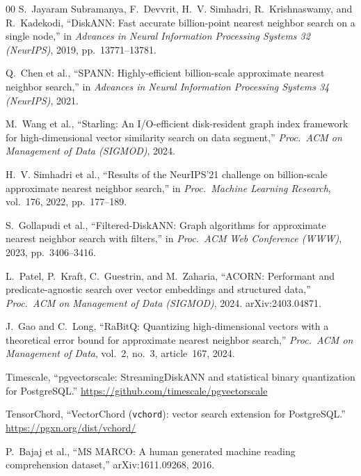 \documentclass[preprint,12pt]{elsarticle}
\begin{document}
\begin{thebibliography}{00}
S.~Jayaram Subramanya, F.~Devvrit, H.~V. Simhadri, R.~Krishnaswamy, and R.~Kadekodi,
``DiskANN: Fast accurate billion-point nearest neighbor search on a single node,'' in
\textit{Advances in Neural Information Processing Systems 32 (NeurIPS)}, 2019,
pp.~13771--13781.

Q.~Chen et al., ``SPANN: Highly-efficient billion-scale approximate nearest neighbor
search,'' in \textit{Advances in Neural Information Processing Systems 34 (NeurIPS)}, 2021.

M.~Wang et al., ``Starling: An I/O-efficient disk-resident graph index framework for
high-dimensional vector similarity search on data segment,'' \textit{Proc.\ ACM on Management
of Data (SIGMOD)}, 2024.

H.~V. Simhadri et al., ``Results of the NeurIPS'21 challenge on billion-scale approximate
nearest neighbor search,'' in \textit{Proc.\ Machine Learning Research}, vol.~176, 2022,
pp.~177--189.

S.~Gollapudi et al., ``Filtered-DiskANN: Graph algorithms for approximate nearest neighbor
search with filters,'' in \textit{Proc.\ ACM Web Conference (WWW)}, 2023, pp.~3406--3416.

L.~Patel, P.~Kraft, C.~Guestrin, and M.~Zaharia, ``ACORN: Performant and predicate-agnostic
search over vector embeddings and structured data,'' \textit{Proc.\ ACM on Management of Data
(SIGMOD)}, 2024. arXiv:2403.04871.

J.~Gao and C.~Long, ``RaBitQ: Quantizing high-dimensional vectors with a theoretical error
bound for approximate nearest neighbor search,'' \textit{Proc.\ ACM on Management of Data},
vol.~2, no.~3, article~167, 2024.

Timescale, ``pgvectorscale: StreamingDiskANN and statistical binary quantization for
PostgreSQL.'' \url{https://github.com/timescale/pgvectorscale}

TensorChord, ``VectorChord (\texttt{vchord}): vector search extension for PostgreSQL.''
\url{https://pgxn.org/dist/vchord/}

P.~Bajaj et al., ``MS MARCO: A human generated machine reading comprehension
dataset,'' arXiv:1611.09268, 2016.

\end{thebibliography}
\end{document}
